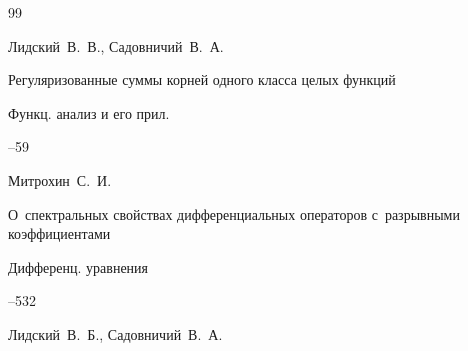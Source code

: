 \begin{thebibliography}{99}







\by	Лидский~В.~В., Садовничий~В.~А.

\paper Регуляризованные суммы корней одного класса целых функций

\jour Функц. анализ и его прил.




--59














\by Митрохин~С.~И.

\paper О~спектральных свойствах дифференциальных операторов с~разрывными коэффициентами

\jour Дифференц. уравнения




--532







\by Лидский~В.~Б., Садовничий~В.~А.


\end{thebibliography}
